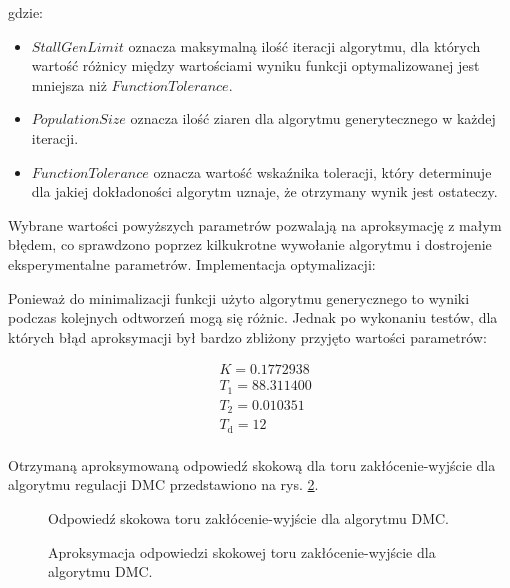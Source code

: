 \documentclass[a4paper,titlepage,11pt,twosides,floatssmall]{mwrep}
\begin{document}
gdzie:

\begin{itemize}
	\item $StallGenLimit$ oznacza maksymalną ilość iteracji algorytmu, dla których wartość różnicy między wartościami wyniku funkcji optymalizowanej jest mniejsza niż $FunctionTolerance$.
	\item $PopulationSize$ oznacza ilość ziaren dla algorytmu generytecznego w każdej iteracji.
	\item $FunctionTolerance$ oznacza wartość wskaźnika toleracji, który determinuje dla jakiej dokładoności algorytm uznaje, że otrzymany wynik jest ostateczy.
\end{itemize}

Wybrane wartości powyższych parametrów pozwalają na aproksymację z małym błędem, co sprawdzono poprzez kilkukrotne wywołanie algorytmu i dostrojenie eksperymentalne parametrów. Implementacja optymalizacji:



Ponieważ do  minimalizacji funkcji użyto algorytmu generycznego to wyniki podczas kolejnych odtworzeń mogą się różnic. Jednak po wykonaniu testów, dla których błąd aproksymacji był bardzo zbliżony przyjęto wartości parametrów:

\begin{equation}
	\begin{split}
		& K = 0.1772938\\
		& T_1 = 88.311400 \\
		& T_2 = 0.010351 \\
		& T_{\mathrm{d}} = 12 \\
	\end{split}
\end{equation}

Otrzymaną aproksymowaną odpowiedź skokową dla toru zakłócenie-wyjście dla algorytmu regulacji DMC przedstawiono na rys. \ref{skok_DMC_zak_apro}.

\begin{figure}[H]
	\centering
	
	\caption{Odpowiedź skokowa toru zakłócenie-wyjście dla algorytmu DMC.}
	\label{skok_DMC_zak}
\end{figure}
	
	
\begin{figure}[H]
	\centering
	
	\caption{Aproksymacja odpowiedzi skokowej toru zakłócenie-wyjście dla algorytmu DMC.}
	\label{skok_DMC_zak_apro}
\end{figure}
\end{document}
